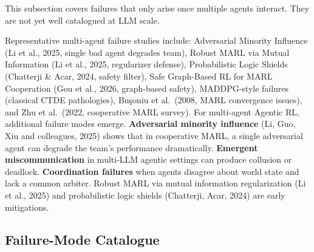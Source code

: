 This subsection covers failures that only arise once multiple agents interact. They are not yet well catalogued at LLM scale.

Representative multi-agent failure studies include: Adversarial Minority Influence (Li et al., 2025, single bad agent degrades team), Robust MARL via Mutual Information (Li et al., 2025, regularizer defense), Probabilistic Logic Shields (Chatterji \& Acar, 2024, safety filter), Safe Graph-Based RL for MARL Cooperation (Gou et al., 2026, graph-based safety), MADDPG-style failures (classical CTDE pathologies), Buşoniu et al.~(2008, MARL convergence issues), and Zhu et al.~(2022, cooperative MARL survey). For multi-agent Agentic RL, additional failure modes emerge. \textbf{Adversarial minority influence} (Li, Guo, Xiu and colleagues, 2025) shows that in cooperative MARL, a single adversarial agent can degrade the team's performance dramatically. \textbf{Emergent miscommunication} in multi-LLM agentic settings can produce collusion or deadlock. \textbf{Coordination failures} when agents disagree about world state and lack a common arbiter. Robust MARL via mutual information regularization (Li et al., 2025) and probabilistic logic shields (Chatterji, Acar, 2024) are early mitigations.

\subsection{Failure-Mode Catalogue}\label{failure-mode-catalogue}

